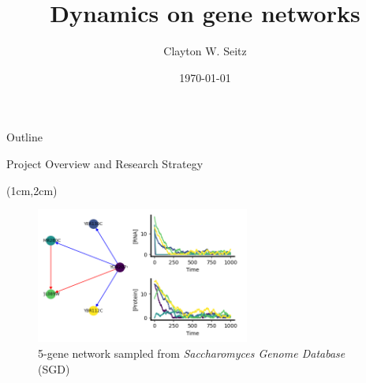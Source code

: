 \documentclass[aspectratio=1610]{beamer}					%
\title{Dynamics on gene networks}	%
\author{Clayton W. Seitz}								%
\date{\today}									%
\begin{document}
\begin{frame}
  \titlepage
\end{frame}

\begin{frame}{Outline}
  \tableofcontents
\end{frame}

%

\begin{frame}{Project Overview and Research Strategy}

\begin{textblock*}{7cm}(1cm,2cm)
\begin{figure}
\includegraphics[width=7cm]{linear.png}
\caption{5-gene network sampled from \emph{Saccharomyces Genome Database} (SGD)}
\end{figure}
\end{textblock*}

\end{frame}
\end{document}
